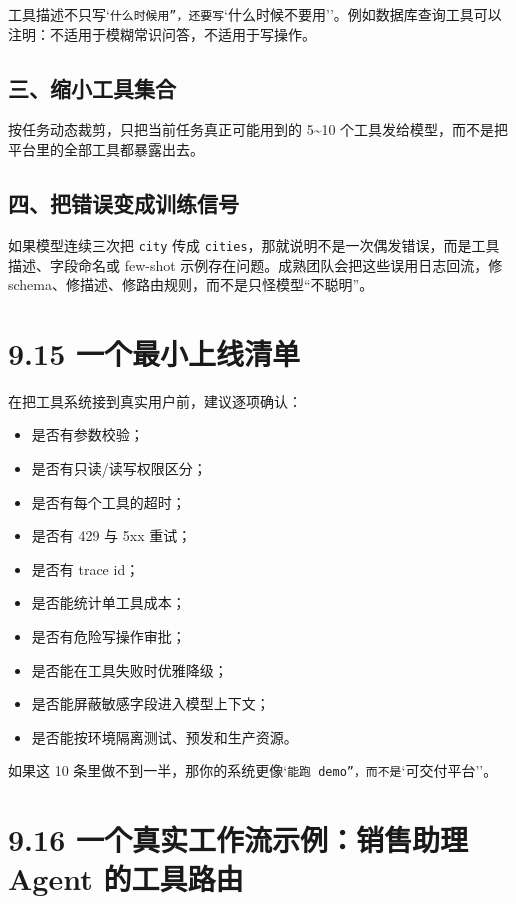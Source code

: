 工具描述不只写`\texttt{什么时候用''，还要写}`什么时候不要用''。例如数据库查询工具可以注明：不适用于模糊常识问答，不适用于写操作。


\subsection{三、缩小工具集合}

按任务动态裁剪，只把当前任务真正可能用到的 5\textasciitilde{}10 个工具发给模型，而不是把平台里的全部工具都暴露出去。


\subsection{四、把错误变成训练信号}

如果模型连续三次把 \texttt{city} 传成 \texttt{cities}，那就说明不是一次偶发错误，而是工具描述、字段命名或 few-shot 示例存在问题。成熟团队会把这些误用日志回流，修 schema、修描述、修路由规则，而不是只怪模型``不聪明''。


\section{9.15 一个最小上线清单}

在把工具系统接到真实用户前，建议逐项确认：


\begin{itemize}[leftmargin=2em]
\item 是否有参数校验；
\item 是否有只读/读写权限区分；
\item 是否有每个工具的超时；
\item 是否有 429 与 5xx 重试；
\item 是否有 trace id；
\item 是否能统计单工具成本；
\item 是否有危险写操作审批；
\item 是否能在工具失败时优雅降级；
\item 是否能屏蔽敏感字段进入模型上下文；
\item 是否能按环境隔离测试、预发和生产资源。
\end{itemize}

如果这 10 条里做不到一半，那你的系统更像`\texttt{能跑 demo''，而不是}`可交付平台''。


\section{9.16 一个真实工作流示例：销售助理 Agent 的工具路由}

